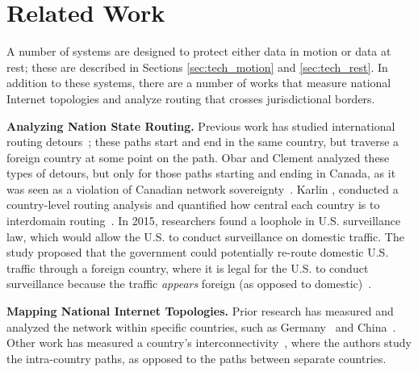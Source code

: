 \section{Related Work}
\label{sec:related}

A number of systems are designed to protect either data in motion or data at rest; these are described in Sections \ref{sec:tech_motion} and \ref{sec:tech_rest}.  In addition to these systems, there are a number of works that measure national Internet topologies and analyze routing that crosses jurisdictional borders.

{\bf Analyzing Nation State Routing.}  Previous work has studied international routing detours~\cite{shah2015characterizing}; these paths start and end in the same country, but traverse a foreign country at some point on the path.  Obar and Clement analyzed these types of detours, but only for those paths starting and ending in Canada, as it was seen as a violation of Canadian network sovereignty~\cite{obar2013internet}.  Karlin \ea, conducted a country-level routing analysis and quantified how central each country is to interdomain routing~\cite{karlin2009nation}.  In 2015, researchers found a loophole in U.S. surveillance law, which would allow the U.S. to conduct surveillance on domestic traffic.  The study proposed that the government could potentially re-route domestic U.S. traffic through a foreign country, where it is legal for the U.S. to conduct surveillance because the traffic {\it appears} foreign (as opposed to domestic)~\cite{arnbak2015loopholes}.

{\bf Mapping National Internet Topologies.}  Prior research has measured and analyzed the network within specific countries, such as Germany~\cite{wahlisch2010framework,wahlisch2012exposing} and China~\cite{zhou2007chinese}.  Other work has measured a country's interconnectivity~\cite{bischof2015and,fanou2015diversity,gupta2014peering}, where the authors study the intra-country paths, as opposed to the paths between separate countries.  
